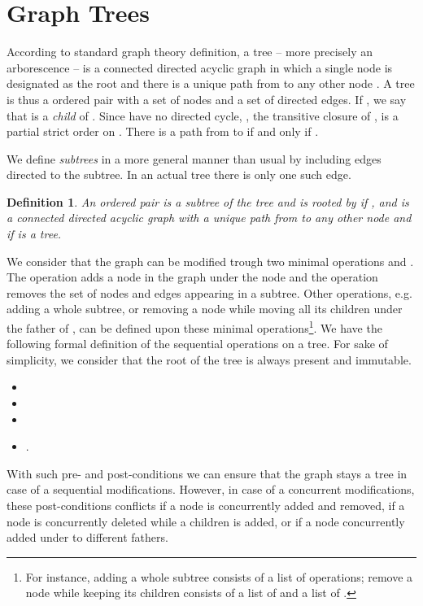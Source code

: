 \documentclass[a4paper]{article}
\newtheorem{definition}{Definition}
\begin{document}
\section{Graph Trees}
\label{sec:graph}

According to standard graph theory definition, a tree -- more precisely
an arborescence -- is a connected directed acyclic graph in which a
single node  is designated as the root and there is a
unique path from  to any other node \cite{diestel2010graph}. A
tree is thus a ordered pair  with  a set of nodes and
 a set of directed edges. If , we
say that  is a {\em child} of . Since  have no directed
cycle, , the transitive closure of , is a partial strict
order on . There is a path from  to  if and only if .

We define {\em subtrees} in a more general manner than usual by
including edges directed to the subtree. In an actual tree there is
only one such edge.
\begin{definition}
  An ordered pair  is a subtree of the tree  and is
  rooted by  if ,  and  is a connected directed
  acyclic graph with a unique path from  to any other node and if
   is a tree.
\end{definition}

We consider that the graph can be modified trough two minimal
operations  and . The operation  adds a node 
in the graph under the node  and the operation  removes
the set of nodes and edges appearing in a subtree. Other 
operations, e.g. adding a whole subtree, or removing a node while
moving all its children under the father of , can be defined upon
these minimal operations\footnote{For instance, adding a whole subtree
  consists of a list of  operations; remove a node while
  keeping its children consists of a list of  and a list of
  .}.
We have the following formal definition of the sequential operations
on a tree. For sake of simplicity, we consider that the root of the
tree is always present and immutable.
\begin{itemize}
\item 
\item 
\item    
\item .
\end{itemize}

With such pre- and post-conditions we can ensure that the graph
 stays a tree in case of a sequential modifications. However,
in case of a concurrent modifications, these post-conditions conflicts
if a node is concurrently added and removed, if a node is concurrently
deleted while a children is added, or if a node concurrently added
under to different fathers.
\end{document}
